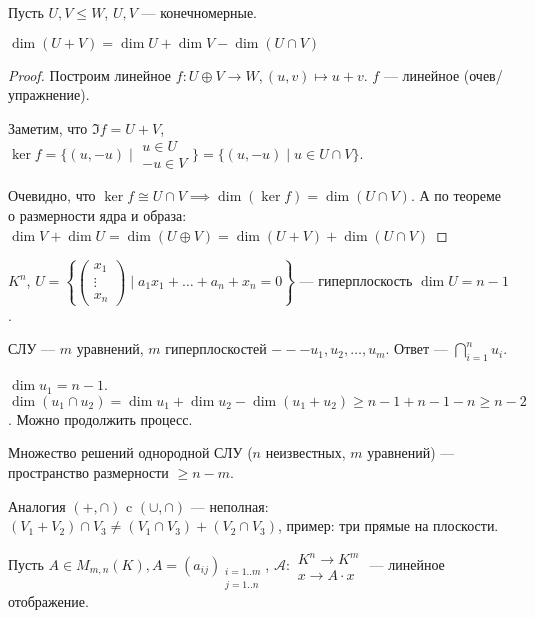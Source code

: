 \begin{theorem}
   Пусть $U, V \le W$, $U, V$ --- конечномерные.

   $\dim(U + V) = \dim U + \dim V - \dim(U \cap V)$
\end{theorem}
\begin{proof}
    Построим линейное $f\!: U \oplus V \to W, (u, v) \mapsto u + v$. $f$ --- линейное (очев/упражнение).

    Заметим, что $\Im f = U+V$,  $\ker f = \{(u, -u) \mid \begin{array}{r} u \in U \\ -u \in V \end{array} \} = \{ (u, -u) \mid u \in U \cap V \}$.

    Очевидно, что $\ker f \cong U \cap V \implies \dim (\ker f) = \dim (U \cap V)$. А по теореме о размерности ядра и образа:  $\dim V + \dim U = \dim(U \oplus V) = \dim(U + V) + \dim(U \cap V)$
\end{proof}
\begin{example}
    $K^n$, $U = \left\{ \begin{pmatrix} x_1 \\ \vdots \\ x_n \end{pmatrix} \mid a_1 x_1 + \ldots + a_n + x_n = 0\right\}$ --- гиперплоскость $\dim U = n - 1$. 

    СЛУ ---  $m$ уравнений,  $m$ гиперплоскостей  $--- u_1, u_2, \ldots, u_m$. Ответ --- $\bigcap\limits_{i=1}^n u_i$.

    $\dim u_1 = n - 1$. $\dim (u_1 \cap u_2) = \dim u_1 + \dim u_2 - \dim (u_1 + u_2) \ge n - 1 + n - 1 - n \ge n - 2$. Можно продолжить процесс.
\end{example}
\begin{consequence}
    Множество решений однородной СЛУ ($n$ неизвестных,  $m$ уравнений) --- пространство размерности $\ge n - m$.
\end{consequence}
\begin{remark}
    Аналогия $(+, \cap)$ c  $(\cup, \cap)$ --- неполная:  $(V_1 + V_2) \cap V_3 \neq (V_1 \cap V_3) + (V_2 \cap V_3)$, пример: три прямые на плоскости.
\end{remark}

Пусть $A \in M_{m, n}(K), A = (a_{ij})_{\substack{i = 1..m \\ j = 1..n}}$,  $\mathcal{A}\!: \begin{array}{c} K^n \to K^m \\ x \to A \cdot x \end{array}$ --- линейное отображение.

